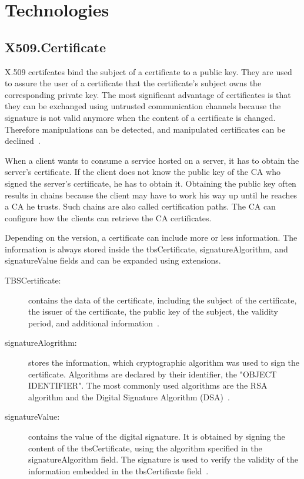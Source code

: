 \section{Technologies}
\subsection{X509.Certificate}
X.509 certifcates bind the subject of a certificate to a public key.
They are used to assure the user of a certificate that the certificate's subject owns the corresponding private key.
The most significant advantage of certificates is that they can be exchanged using untrusted communication channels because the signature is not valid anymore when the content of a certificate is changed.
Therefore manipulations can be detected, and manipulated certificates can be declined~\cite{x509rfc}.

When a client wants to consume a service hosted on a server, it has to obtain the server's certificate.
If the client does not know the public key of the CA who signed the server's certificate, he has to obtain it.
Obtaining the public key often results in chains because the client may have to work his way up until he reaches a CA he trusts.
Such chains are also called certification paths.
The CA can configure how the clients can retrieve the CA certificates.

Depending on the version, a certificate can include more or less information.
The information is always stored inside the tbsCertificate, signatureAlgorithm, and signatureValue fields and can be expanded using extensions.
\begin{description}
	\item[TBSCertificate:] contains the data of the certificate, including the subject of the certificate, the issuer of the certificate, the public key of the subject, the validity period, and additional information~\cite{x509rfc}.
	\item[signatureAlogrithm:] stores the information, which cryptographic algorithm was used to sign the certificate.
		Algorithms are declared by their identifier, the "OBJECT IDENTIFIER".
		The most commonly used algorithms are the RSA algorithm and the Digital Signature Algorithm (DSA)~\cite{x509rfc}.
	\item[signatureValue:] contains the value of the digital signature.
		It is obtained by signing the content of the tbsCertificate, using the algorithm specified in the signatureAlgorithm field.
		The signature is used to verify the validity of the information embedded in the tbsCertificate field~\cite{x509rfc}.
\end{description}


